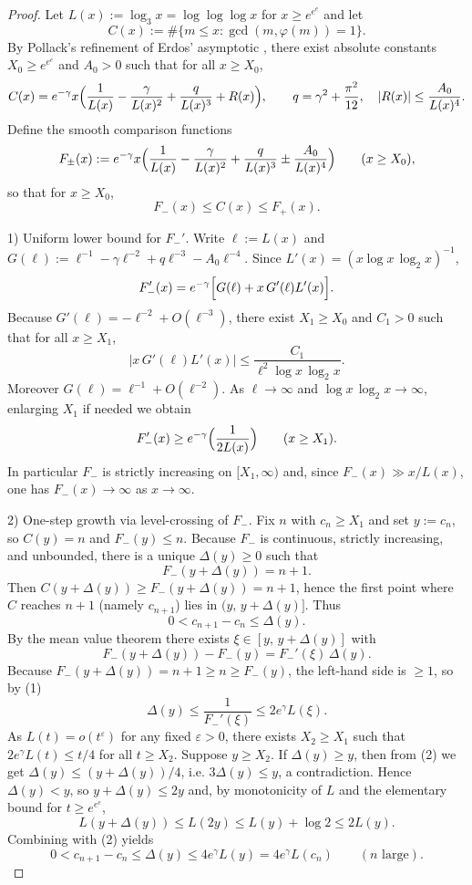 \documentclass[12pt]{article}
\renewcommand{\tag}[1]{}
\theoremstyle{remark}
\begin{document}
\begin{proof}
Let $L(x):=\log_3 x=\log\log\log x$ for $x\ge e^{e^e}$ and let
$$C(x):=\#\{m\le x: \gcd(m,\varphi(m))=1\}.$$
By Pollack's refinement of Erdos' asymptotic \cite{Pollack2022}, there exist absolute constants $X_0\ge e^{e^e}$ and $A_0>0$ such that for all $x\ge X_0$,
$$
C(x)=e^{-\gamma}x\Bigl(\frac1{L(x)}-\frac{\gamma}{L(x)^2}+\frac{q}{L(x)^3}+R(x)\Bigr),\qquad q=\gamma^2+\frac{\pi^2}{12},\quad |R(x)|\le \frac{A_0}{L(x)^4}.
$$
Define the smooth comparison functions
$$
F_\pm(x):=e^{-\gamma}x\Bigl(\frac1{L(x)}-\frac{\gamma}{L(x)^2}+\frac{q}{L(x)^3}\pm\frac{A_0}{L(x)^4}\Bigr)\qquad(x\ge X_0),
$$
so that for $x\ge X_0$,
$$
F_-(x)\le C(x)\le F_+(x).
$$

1) Uniform lower bound for $F_-'$. Write $\ell:=L(x)$ and $G(\ell):=\ell^{-1}-\gamma\ell^{-2}+q\ell^{-3}-A_0\ell^{-4}$. Since $L'(x)=(x\log x\,\log_2 x)^{-1}$,
$$
F_-'(x)=e^{-\gamma}\Bigl[G(\ell)+x\,G'(\ell)L'(x)\Bigr].
$$
Because $G'(\ell)=-\ell^{-2}+O(\ell^{-3})$, there exist $X_1\ge X_0$ and $C_1>0$ such that for all $x\ge X_1$,
$$
\bigl|x\,G'(\ell)L'(x)\bigr|\le \frac{C_1}{\ell^2\log x\,\log_2 x}.
$$
Moreover $G(\ell)=\ell^{-1}+O(\ell^{-2})$. As $\ell\to\infty$ and $\log x\,\log_2 x\to\infty$, enlarging $X_1$ if needed we obtain
$$
F_-'(x)\ge e^{-\gamma}\Bigl(\frac{1}{2L(x)}\Bigr)\qquad(x\ge X_1).\tag{1}
$$
In particular $F_-$ is strictly increasing on $[X_1,\infty)$ and, since $F_-(x)\gg x/L(x)$, one has $F_-(x)\to\infty$ as $x\to\infty$.

2) One-step growth via level-crossing of $F_-$. Fix $n$ with $c_n\ge X_1$ and set $y:=c_n$, so $C(y)=n$ and $F_-(y)\le n$. Because $F_-$ is continuous, strictly increasing, and unbounded, there is a unique $\Delta(y)\ge0$ such that
$$
F_-(y+\Delta(y))=n+1.
$$
Then $C(y+\Delta(y))\ge F_-(y+\Delta(y))=n+1$, hence the first point where $C$ reaches $n+1$ (namely $c_{n+1}$) lies in $(y,\,y+\Delta(y)]$. Thus
$$
0<c_{n+1}-c_n\le \Delta(y).
$$
By the mean value theorem there exists $\xi\in[y,\,y+\Delta(y)]$ with
$$
F_-(y+\Delta(y)) - F_-(y)=F_-'(\xi)\,\Delta(y).
$$
Because $F_-(y+\Delta(y))=n+1\ge n\ge F_-(y)$, the left-hand side is $\ge1$, so by (1)
$$
\Delta(y)\le \frac{1}{F_-'(\xi)}\le 2e^{\gamma}L(\xi).\tag{2}
$$
As $L(t)=o(t^{\varepsilon})$ for any fixed $\varepsilon>0$, there exists $X_2\ge X_1$ such that $2e^{\gamma}L(t)\le t/4$ for all $t\ge X_2$. Suppose $y\ge X_2$. If $\Delta(y)\ge y$, then from (2) we get $\Delta(y)\le(y+\Delta(y))/4$, i.e. $3\Delta(y)\le y$, a contradiction. Hence $\Delta(y)<y$, so $y+\Delta(y)\le2y$ and, by monotonicity of $L$ and the elementary bound for $t\ge e^{e^e}$,
$$
L(y+\Delta(y))\le L(2y)\le L(y)+\log 2\le 2L(y).
$$
Combining with (2) yields
$$
0<c_{n+1}-c_n\le\Delta(y)\le 4e^{\gamma}L(y)=4e^{\gamma}L(c_n)\qquad(n\text{ large}).\tag{3}
$$


\end{proof}
\end{document}
